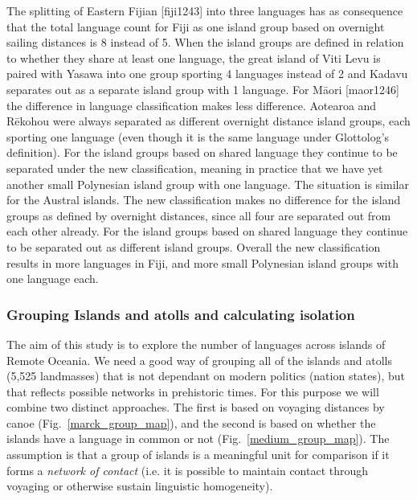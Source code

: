 \documentclass[a4paper,10pt]{article} %
\begin{document}
The splitting of Eastern Fijian [fiji1243] into three languages has as consequence that the total language count for Fiji as one island group based on overnight sailing distances is 8 instead of 5. When the island groups are defined in relation to whether they share at least one language, the great island of Viti Levu is paired with Yasawa into one group sporting 4 languages instead of 2 and Kadavu separates out as a separate island group with 1 language. For M\={a}ori [maor1246] the difference in language classification makes less difference. Aotearoa and  R\={e}kohou were always separated as different overnight distance island groups, each sporting one language (even though it is the same language under Glottolog's definition). For the island groups based on shared language they continue to be separated under the new classification, meaning in practice that we have yet another small Polynesian island group with one language. The situation is similar for the Austral islands. The new classification makes no difference for the island groups as defined by overnight distances, since all four are separated out from each other already. For the island groups based on shared language they continue to be separated out as different island groups. Overall the new classification results in more languages in Fiji, and more small Polynesian island groups with one language each.

\subsubsection{Grouping Islands and atolls and calculating isolation}
\label{sec:island_geo}


The aim of this study is to explore the number of languages across islands of Remote Oceania. We need a good way of grouping all of the islands and atolls (5,525 landmasses) that is not dependant on modern politics (nation states), but that reflects possible networks in prehistoric times. For this purpose we will combine two distinct approaches. The first is based on voyaging distances by canoe (Fig.~\ref{marck_group_map}), and the second is based on whether the islands have a language in common or not (Fig.~\ref{medium_group_map}). The assumption is that a group of islands is a meaningful unit for comparison if it forms a \textit{network of contact} (i.e. it is possible to maintain contact through voyaging or otherwise sustain linguistic homogeneity). 
\end{document}
